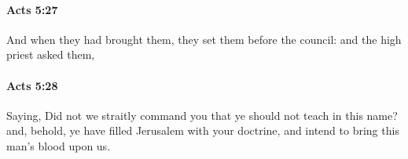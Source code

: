 		\paragraph{Acts 5:27} %
			\label{ACTS-5-27}

			And when they had brought them, they set them before the council: and the high priest asked them,

			\begin{framed}
			\scriptsize
				\begin{compactdesc}
					\item[SBLG] 
				\end{compactdesc}
			\end{framed}

		\paragraph{Acts 5:28} %
			\label{ACTS-5-28}

			Saying, Did not we straitly command you that ye should not teach in this name?  and, behold, ye have filled Jerusalem with your doctrine, and intend to bring this man's blood upon us.

